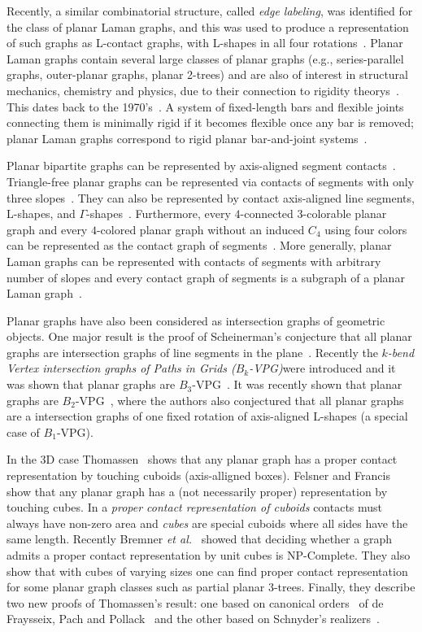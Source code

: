 \documentclass{llncs}
\begin{document}
Recently, a similar combinatorial structure, called \emph{edge labeling}, was identified for the class of planar Laman graphs, and  this was used to produce a representation of such graphs as L-contact graphs, with L-shapes in all four rotations~\cite{full}.
 Planar Laman graphs contain several large classes of planar graphs (e.g., series-parallel graphs, outer-planar graphs, planar 2-trees) and are also of interest in structural mechanics, chemistry and physics, due to their connection to rigidity theorys~\cite{hors+-pmrgpt-05}. This dates back to the 1970's~\cite{Laman}. A system of fixed-length bars and flexible joints connecting them is minimally rigid if it becomes flexible once any bar is removed; planar Laman graphs correspond to rigid planar bar-and-joint systems~\cite{hors+-pmrgpt-05}.

Planar bipartite graphs can be represented by axis-aligned segment
contacts~\cite{CzyzowiczKU98,fop-rpgs-91,rt-rplbopg-86}.
Triangle-free planar graphs can be represented via
contacts of segments with only three slopes~\cite{CastroCDMN02}. They can also be represented by contact axis-aligned line segments, L-shapes, and $\Gamma$-shapes~\cite{ChaplickU12}.
Furthermore, every $4$-connected $3$-colorable planar graph and every $4$-colored planar graph without an induced $C_4$ using four colors can be represented as the contact graph of segments~\cite{fo-rcis-07}. More generally, planar Laman graphs can be represented with contacts of segments with arbitrary number of slopes and every contact graph of segments is a subgraph of a planar Laman graph~\cite{A+11}.


Planar graphs have also been considered as intersection graphs of geometric objects. One major result is the proof of Scheinerman's conjecture that all planar graphs are intersection graphs of line segments in the plane~\cite{Chalopin:2009}. Recently the \emph{$k$-bend Vertex intersection graphs of Paths in Grids ($B_k$-VPG)}were introduced and it was shown that planar graphs are $B_3$-VPG~\cite{Asinowski2012}. It was recently shown that planar graphs are $B_2$-VPG~\cite{ChaplickU12}, where the authors also conjectured that all planar graphs are a intersection graphs of one fixed rotation of axis-aligned L-shapes (a special case of $B_1$-VPG). 

In the 3D case Thomassen~\cite{Thomassen86} shows that any planar graph has a proper contact representation by touching cuboids (axis-alligned boxes). Felsner and Francis~\cite{Felsner11} show that any planar graph has a (not necessarily proper) representation by touching cubes. In a \emph{proper contact representation of cuboids} contacts must always have non-zero area and \emph{cubes} are special cuboids where all sides have the same length.
Recently Bremner {\em et al.}~\cite{cubes12} showed that deciding whether a graph admits a proper contact representation by unit cubes is NP-Complete. They also show that with cubes of varying sizes one can find proper contact representation for some planar graph classes such as partial planar $3$-trees. Finally, they describe two new proofs of Thomassen's result: one based on canonical orders~\cite{fpp-hdpgg-90} of de Fraysseix, Pach and Pollack~\cite{fpp-hdpgg-90} and the other based on Schnyder's realizers~\cite{s-epgg-90}. 
\end{document}
